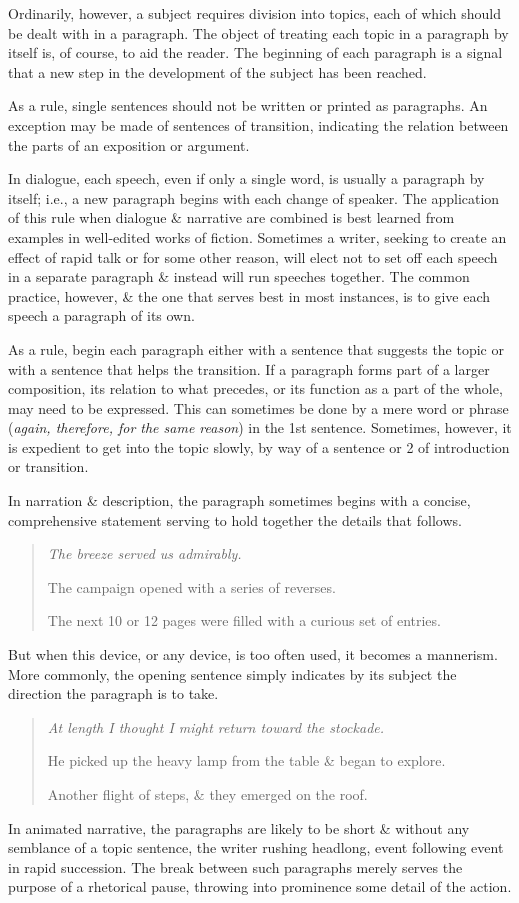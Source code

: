\documentclass{article}
\numberwithin{equation}{section}
\begin{document}
Ordinarily, however, a subject requires division into topics, each of which should be dealt with in a paragraph. The object of treating each topic in a paragraph by itself is, of course, to aid the reader. The beginning of each paragraph is a signal that a new step in the development of the subject has been reached.

As a rule, single sentences should not be written or printed as paragraphs. An exception may be made of sentences of transition, indicating the relation between the parts of an exposition or argument.

In dialogue, each speech, even if only a single word, is usually a paragraph by itself; i.e., a new paragraph begins with each change of speaker. The application of this rule when dialogue \& narrative are combined is best learned from examples in well-edited works of fiction. Sometimes a writer, seeking to create an effect of rapid talk or for some other reason, will elect not to set off each speech in a separate paragraph \& instead will run speeches together. The common practice, however, \& the one that serves best in most instances, is to give each speech a paragraph of its own.

As a rule, begin each paragraph either with a sentence that suggests the topic or with a sentence that helps the transition. If a paragraph forms part of a larger composition, its relation to what precedes, or its function as a part of the whole, may need to be expressed. This can sometimes be done by a mere word or phrase (\textit{again, therefore, for the same reason}) in the 1st sentence. Sometimes, however, it is expedient to get into the topic slowly, by way of a sentence or 2 of introduction or transition.

In narration \& description, the paragraph sometimes begins with a concise, comprehensive statement serving to hold together the details that follows.
\begin{quotation}\it
	The breeze served us admirably.
	
	The campaign opened with a series of reverses.
	
	The next 10 or 12 pages were filled with a curious set of entries.
\end{quotation}
But when this device, or any device, is too often used, it becomes a mannerism. More commonly, the opening sentence simply indicates by its subject the direction the paragraph is to take.
\begin{quotation}\it
	At length I thought I might return toward the stockade.
	
	He picked up the heavy lamp from the table \& began to explore.
	
	Another flight of steps, \& they emerged on the roof.
\end{quotation}
In animated narrative, the paragraphs are likely to be short \& without any semblance of a topic sentence, the writer rushing headlong, event following event in rapid succession. The break between such paragraphs merely serves the purpose of a rhetorical pause, throwing into prominence some detail of the action.
\end{document}
